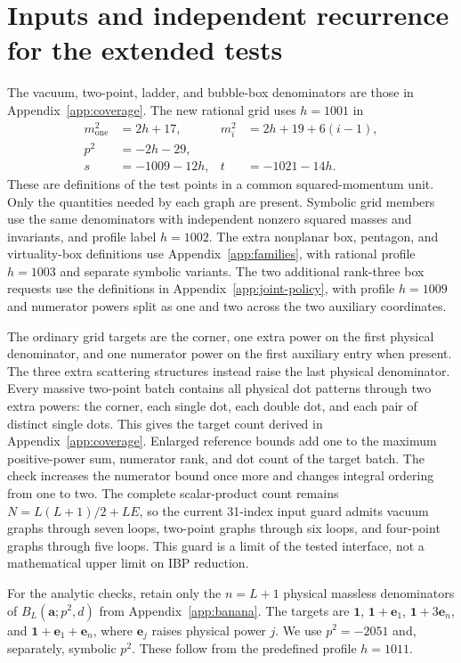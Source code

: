 \section{Inputs and independent recurrence for the extended tests}
\label{app:extended-coverage}
The vacuum, two-point, ladder, and bubble-box denominators are those in Appendix~\ref{app:coverage}. The new rational grid uses $h=1001$ in
\begin{equation}
 \begin{aligned}
 m_{\mathrm{one}}^2&=2h+17, & m_i^2&=2h+19+6(i-1),\\
 p^2&=-2h-29,\\
 s&=-1009-12h, & t&=-1021-14h.
 \end{aligned}
\end{equation}
These are definitions of the test points in a common squared-momentum unit. Only the quantities needed by each graph are present. Symbolic grid members use the same denominators with independent nonzero squared masses and invariants, and profile label $h=1002$. The extra nonplanar box, pentagon, and virtuality-box definitions use Appendix~\ref{app:families}, with rational profile $h=1003$ and separate symbolic variants. The two additional rank-three box requests use the definitions in Appendix~\ref{app:joint-policy}, with profile $h=1009$ and numerator powers split as one and two across the two auxiliary coordinates.

The ordinary grid targets are the corner, one extra power on the first physical denominator, and one numerator power on the first auxiliary entry when present. The three extra scattering structures instead raise the last physical denominator. Every massive two-point batch contains all physical dot patterns through two extra powers: the corner, each single dot, each double dot, and each pair of distinct single dots. This gives the target count derived in Appendix~\ref{app:coverage}. Enlarged reference bounds add one to the maximum positive-power sum, numerator rank, and dot count of the target batch. The check increases the numerator bound once more and changes integral ordering from one to two. The complete scalar-product count remains $N=L(L+1)/2+LE$, so the current 31-index input guard admits vacuum graphs through seven loops, two-point graphs through six loops, and four-point graphs through five loops. This guard is a limit of the tested interface, not a mathematical upper limit on IBP reduction.

For the analytic checks, retain only the $n=L+1$ physical massless denominators of $B_L(\boldsymbol a;p^2,d)$ from Appendix~\ref{app:banana}. The targets are $\boldsymbol 1$, $\boldsymbol 1+\boldsymbol e_1$, $\boldsymbol 1+3\boldsymbol e_n$, and $\boldsymbol 1+\boldsymbol e_1+\boldsymbol e_n$, where $\boldsymbol e_j$ raises physical power $j$. We use $p^2=-2051$ and, separately, symbolic $p^2$. These follow from the predefined profile $h=1011$.

